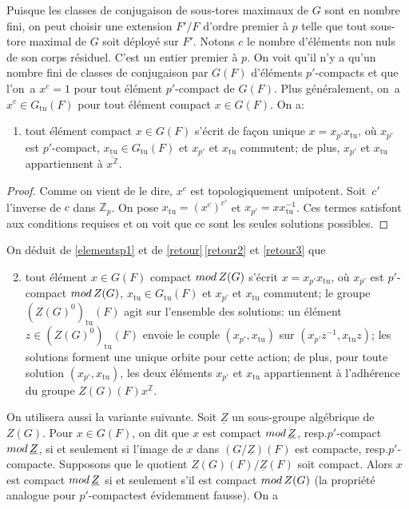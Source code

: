 \documentclass[11pt]{article}
\newcommand{\resp}{resp.\xspace}
\numberwithin{equation}{section}\providecommand{\og}{«\,}\providecommand{\fg}{\,»}
\newcommand{\rmod}{\textup{mod}\,}
\newcommand{\tu}{\mathrm{tu}}
\newcommand{\ZZ}{\mathbb{Z}}
\theoremstyle{plain}
\theoremstyle{definition}
\begin{document}
Puisque les classes de conjugaison de sous-tores maximaux de $G$ sont en nombre fini, on peut choisir une extension $F'/F$ d'ordre premier à $p$ telle que tout sous-tore maximal de $G$ soit déployé sur $F'$. Notons $c$ le nombre d'éléments non nuls de son corps résiduel. C'est un entier premier à $p$. On voit
qu'il n'y a qu'un nombre fini de classes de conjugaison par $G(F)$ d'éléments $p'$-compacts et que l'on~a $x^c=1$ pour tout élément $p'$-compact de $G(F)$. Plus généralement, on~a $x^c\in G_{\tu}(F)$ pour tout élément compact $x\in G(F)$. On a:
\begin{enumerate}
\item\label{elementsp1}
tout élément compact $x\in G(F)$ s'écrit de façon unique $x=x_{p'}x_{\tu}$, où $x_{p'}$ est $p'$-compact, $x_{\tu}\in G_{\tu}(F)$ et $x_{p'}$ et $x_{\tu}$ commutent; de plus, $x_{p'}$ et $x_{\tu}$ appartiennent à $\overline{x^{\ZZ}}$.
\end{enumerate}

\begin{proof}
Comme on vient de le dire, $x^c$ est topologiquement unipotent. Soit~$c'$ l'inverse de $c$ dans $\ZZ_{p}$. On pose $x_{\tu}=(x^c)^{c'}$ et $x_{p'}=xx_{\tu}^{-1}$. Ces termes satisfont aux conditions requises et on voit que ce sont les seules solutions possibles.
\end{proof}

On déduit de \eqref{elementsp1} et de \ref{retour}\,\eqref{retour2} et \eqref{retour3} que
\begin{enumerate}\setcounter{enumi}{1}
\item\label{elementsp2}
tout élément $x\in G(F)$ compact $\rmod Z(G)$ s'écrit $x=x_{p'}x_{\tu}$, où $x_{p'}$ est $p'$\nobreakdash-compact $\rmod Z(G)$, $x_{\tu}\in G_{\tu}(F)$ et $x_{p'}$ et $x_{\tu}$ commutent; le groupe $(Z(G)^0)_{\tu}(F)$ agit sur l'ensemble des solutions: un élément $z\in (Z(G)^0)_{\tu}(F)$ envoie le couple $(x_{p'},x_{\tu})$ sur $(x_{p'}z^{-1},x_{\tu}z)$; les solutions forment une unique orbite pour cette action; de plus, pour toute solution $(x_{p'},x_{\tu})$, les deux éléments $x_{p'}$ et $x_{\tu}$ appartiennent à l'adhérence du groupe $Z(G)(F)x^\ZZ$.
\end{enumerate}

On utilisera aussi la variante suivante. Soit $\underline{Z}$ un sous-groupe algébrique de $Z(G)$. Pour $x\in G(F)$, on dit que $x$ est compact $\rmod \underline{Z}$, \resp $p'$-compact $\rmod \underline{Z}$, si et seulement si l'image de $x$ dans $(G/\underline{Z})(F)$ est compacte, \resp $p'$-compacte. Supposons que le quotient $Z(G)(F)/\underline{Z}(F)$ soit compact. Alors $x$ est compact $\rmod \underline{Z}$ si et seulement s'il est compact $\rmod Z(G)$ (la propriété analogue pour \og $p'$-compact\fg est évidemment fausse). On a
\end{document}
